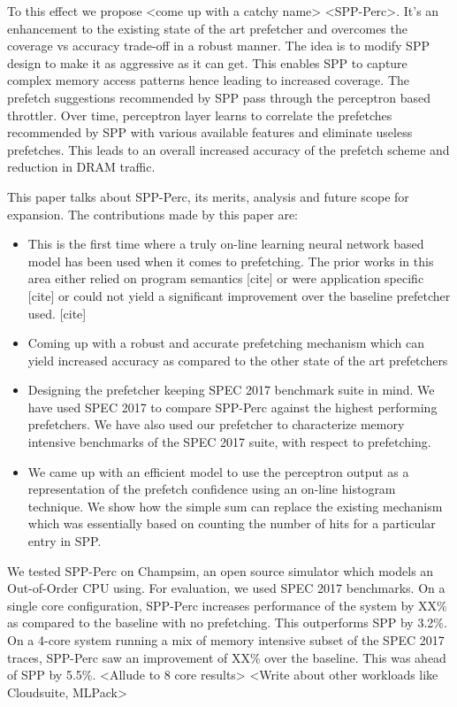 \documentclass{sig-alternate}
\begin{document}
To this effect we propose <come up with a catchy name> <SPP-Perc>. It's an enhancement to the existing state of the art prefetcher and overcomes the coverage vs accuracy trade-off in a robust manner. The idea is to modify SPP design to make it as aggressive as it can get. This enables SPP to capture complex memory access patterns hence leading to increased coverage. The prefetch suggestions recommended by SPP pass through the perceptron based throttler. Over time, perceptron layer learns to correlate the prefetches recommended by SPP with various available features and eliminate useless prefetches. This leads to an overall increased accuracy of the prefetch scheme and reduction in DRAM traffic.

\vspace{1ex}This paper talks about SPP-Perc, its merits, analysis and future scope for expansion. The contributions made by this paper are:

\begin{itemize}
\item This is the first time where a truly on-line learning neural network based model has been used when it comes to prefetching. The prior works in this area either relied on program semantics [cite] or were application specific [cite] or could not yield a significant improvement over the baseline prefetcher used. [cite]

\item Coming up with a robust and accurate prefetching mechanism which can yield increased accuracy as compared to the other state of the art prefetchers

\item Designing the prefetcher keeping SPEC 2017 benchmark suite in mind. We have used SPEC 2017 to compare SPP-Perc against the highest performing prefetchers. We have also used our prefetcher to characterize memory intensive benchmarks of the SPEC 2017 suite, with respect to prefetching.

\item We came up with an efficient model to use the perceptron output as a representation of the prefetch confidence using an on-line histogram technique. We show how the simple sum can replace the existing mechanism which was essentially based on counting the number of hits for a particular entry in SPP.

\end{itemize}

We tested SPP-Perc on Champsim, an open source simulator which models an Out-of-Order CPU using. For evaluation, we used SPEC 2017 benchmarks. On a single core configuration, SPP-Perc increases performance of the system by XX\% as compared to the baseline with no prefetching. This outperforms SPP by 3.2\%. On a 4-core system running a mix of memory intensive subset of the SPEC 2017 traces, SPP-Perc saw an improvement of XX\% over the baseline. This was ahead of SPP by 5.5\%. 
<Allude to 8 core results>
<Write about other workloads like Cloudsuite, MLPack>
\end{document}
